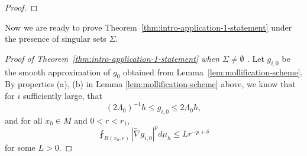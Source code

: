 \documentclass[12pt]{amsart}
\theoremstyle{plain}
\theoremstyle{plain}
\theoremstyle{definition}
\theoremstyle{remark}
\numberwithin{equation}{subsection}
\newcommand{\hdel}{\tilde{\nabla}}
\begin{document}
\begin{proof}
%    
%    
\end{proof}

Now we are ready to prove Theorem~\ref{thm:intro-application-1-statement} under the presence of singular sets $\Sigma$.
\begin{proof}[Proof of Theorem~\ref{thm:intro-application-1-statement} when $\Sigma\neq \emptyset$ ]

Let $g_{i,0}$ be the smooth approximation of $g_0$ obtained from Lemma~\ref{lem:mollification-scheme}.   By properties (a), (b) in Lemma \ref{lem:mollification-scheme} above, we know that for $i$ sufficiently large, that
    \begin{equation}\label{eqn:rough-initial-gi0-Linfty}
        (2\Lambda_0)^{-1}h \leq g_{i,0} \leq 2\Lambda_0 h,
    \end{equation}
    and for all $x_0\in M$ and $0<r<r_1$,
    \begin{equation}\label{eqn:rough-initial-gi0-Morrey}
        \fint_{B(x_0, r)} |\hdel g_{i,0}|^p d\mu_h \leq L r^{-p+\delta}
    \end{equation}
    for some $L> 0$. 
    

\end{proof}
\end{document}
